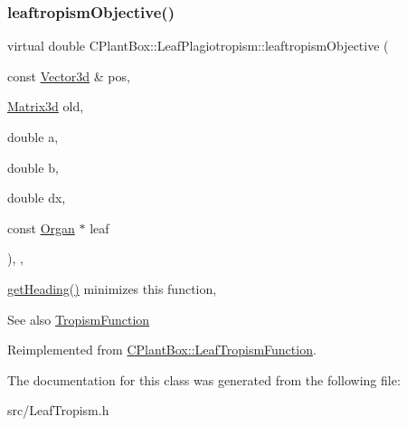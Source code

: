 \subsubsection{\texorpdfstring{leaftropism\+Objective()}{leaftropismObjective()}}
{\footnotesize\ttfamily virtual double C\+Plant\+Box\+::\+Leaf\+Plagiotropism\+::leaftropism\+Objective (\begin{DoxyParamCaption}\item[{const \hyperlink{classCPlantBox_1_1Vector3d}{Vector3d} \&}]{pos,  }\item[{\hyperlink{classCPlantBox_1_1Matrix3d}{Matrix3d}}]{old,  }\item[{double}]{a,  }\item[{double}]{b,  }\item[{double}]{dx,  }\item[{const \hyperlink{classCPlantBox_1_1Organ}{Organ} $\ast$}]{leaf }\end{DoxyParamCaption})\hspace{0.3cm}{\ttfamily [inline]}, {\ttfamily [override]}, {\ttfamily [virtual]}}



\hyperlink{classCPlantBox_1_1LeafTropismFunction_a1440868221a834474e34e3a503a74572}{get\+Heading()} minimizes this function, 

\begin{DoxySeeAlso}{See also}
\hyperlink{classCPlantBox_1_1TropismFunction}{Tropism\+Function} 
\end{DoxySeeAlso}


Reimplemented from \hyperlink{classCPlantBox_1_1LeafTropismFunction_ab89f5f7e80103d80681bc8cadc220dba}{C\+Plant\+Box\+::\+Leaf\+Tropism\+Function}.



The documentation for this class was generated from the following file\+:\begin{DoxyCompactItemize}
\item 
src/Leaf\+Tropism.\+h\end{DoxyCompactItemize}
